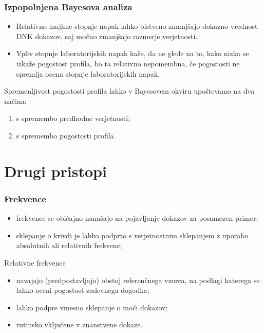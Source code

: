 \documentclass{beamer}
\begin{document}
\begin{frame}
    \frametitle{Izpopolnjena Bayesova analiza}
    \begin{itemize}
        \item Relativno majhne stopnje napak lahko bistveno zmanjšajo dokazno vrednost DNK dokazov, saj močno zmanjšajo razmerje verjetnosti.
        \item Vpliv stopnje laboratorijskih napak kaže, da ne glede na to, kako nizka se izkaže pogostost profila, bo ta relativno nepomembna, če pogostosti ne spremlja ocena stopnje laboratorijskih napak.
    \end{itemize} \vspace{3mm}
    Spremenljivost pogostosti profila lahko v Bayesovem okviru upoštevamo na dva načina: 
    \begin{enumerate}
        \item s spremembo predhodne verjetnosti;
        \item s spremembo pogostosti profila.
    \end{enumerate}
\end{frame}

\section{Drugi pristopi}

\begin{frame}
    \frametitle{Frekvence}
    \begin{itemize}
        \item frekvence se običajno nanašajo na pojavljanje dokazov za posamezen primer;
        \item sklepanje o krivdi je lahko podprto s verjetnostnim sklepanjem z uporabo absolutnih ali relativnih frekvenc;
    \end{itemize}
    \begin{block}{Relativne frekvence}
        \begin{itemize}
            \item navajajo (predpostavljajo) obstoj referenčnega vzorca, na podlagi katerega se lahko oceni pogostost zadevnega dogodka;
            \item lahko podpre vmesno sklepanje o moči dokazov;
            \item rutinsko vključene v znanstvene dokaze.
        \end{itemize}  
    \end{block}
\end{frame}
\end{document}
